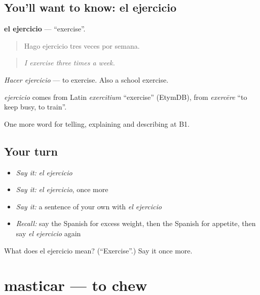 \subsection*{You'll want to know: el ejercicio}
\textbf{el ejercicio} — \textquotedblleft{}exercise\textquotedblright{}.

\begin{quote}
Hago ejercicio tres veces por semana.
\end{quote}

\begin{quote}
\emph{I exercise three times a week.}
\end{quote}

\emph{Hacer ejercicio} — to exercise. Also a school exercise.

\begin{cousinweb}
\emph{ejercicio} comes from Latin \emph{exercitium} \textquotedblleft{}exercise\textquotedblright{} (EtymDB), from \emph{exercēre} \textquotedblleft{}to keep busy, to train\textquotedblright{}.
\end{cousinweb}

\begin{grammarlens}[title={What you've built}]
One more word for telling, explaining and describing at B1.
\end{grammarlens}

\subsection*{Your turn}
\begin{itemize}
\raggedright
  \item \emph{Say it:} \emph{el ejercicio}
  \item \emph{Say it:} \emph{el ejercicio}, once more
  \item \emph{Say it:} a sentence of your own with \emph{el ejercicio}
  \item \emph{Recall:} say the Spanish for excess weight, then the Spanish for appetite, then say \emph{el ejercicio} again
\end{itemize}

\begin{tcolorbox}[breakable,colback=teal!4,colframe=teal!35!black,title={Before you move on}]
What does el ejercicio mean? (\textquotedblleft{}Exercise\textquotedblright{}.) Say it once more.
\end{tcolorbox}
\section[masticar]{masticar — to chew}

